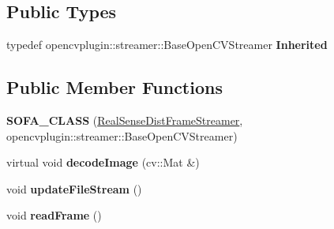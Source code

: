 \subsection*{Public Types}
\begin{DoxyCompactItemize}
\item 
\mbox{\label{classsofa_1_1rgbdtracking_1_1_real_sense_dist_frame_streamer_afa7e78c7718a4c9284e392e8b5ef8a0a}} 
typedef opencvplugin\+::streamer\+::\+Base\+Open\+C\+V\+Streamer {\bfseries Inherited}
\end{DoxyCompactItemize}
\subsection*{Public Member Functions}
\begin{DoxyCompactItemize}
\item 
\mbox{\label{classsofa_1_1rgbdtracking_1_1_real_sense_dist_frame_streamer_af6c388f58476267cf55047f977ba3b39}} 
{\bfseries S\+O\+F\+A\+\_\+\+C\+L\+A\+SS} (\hyperlink{classsofa_1_1rgbdtracking_1_1_real_sense_dist_frame_streamer}{Real\+Sense\+Dist\+Frame\+Streamer}, opencvplugin\+::streamer\+::\+Base\+Open\+C\+V\+Streamer)
\item 
\mbox{\label{classsofa_1_1rgbdtracking_1_1_real_sense_dist_frame_streamer_acf9a105d197775cc56c840dce6edfb31}} 
virtual void {\bfseries decode\+Image} (cv\+::\+Mat \&)
\item 
\mbox{\label{classsofa_1_1rgbdtracking_1_1_real_sense_dist_frame_streamer_a0d02debb133e08b79d32eecb56969ab4}} 
void {\bfseries update\+File\+Stream} ()
\item 
\mbox{\label{classsofa_1_1rgbdtracking_1_1_real_sense_dist_frame_streamer_a01d82d0618162c79579ef1ddeec97872}} 
void {\bfseries read\+Frame} ()
\end{DoxyCompactItemize}

